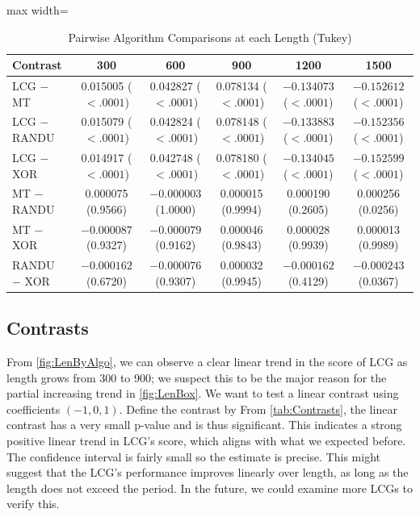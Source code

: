 \documentclass{report}
\begin{document}
\begin{table}[!htbp]
\centering
\begin{adjustbox}{max width=\textwidth}
\begin{tabular}{lccccc}
\toprule
\textbf{Contrast}
& \textbf{300}
& \textbf{600}
& \textbf{900}
& \textbf{1200}
& \textbf{1500} \\
\midrule

LCG $-$ MT
& 0.015005 ($<.0001$)
& 0.042827 ($<.0001$)
& 0.078134 ($<.0001$)
& $-0.134073$ ($<.0001$)
& $-0.152612$ ($<.0001$) \\

LCG $-$ RANDU
& 0.015079 ($<.0001$)
& 0.042824 ($<.0001$)
& 0.078148 ($<.0001$)
& $-0.133883$ ($<.0001$)
& $-0.152356$ ($<.0001$) \\

LCG $-$ XOR
& 0.014917 ($<.0001$)
& 0.042748 ($<.0001$)
& 0.078180 ($<.0001$)
& $-0.134045$ ($<.0001$)
& $-0.152599$ ($<.0001$) \\

\midrule

MT $-$ RANDU
& 0.000075 (0.9566)
& $-0.000003$ (1.0000)
& 0.000015 (0.9994)
& 0.000190 (0.2605)
& 0.000256 (0.0256) \\

MT $-$ XOR
& $-0.000087$ (0.9327)
& $-0.000079$ (0.9162)
& 0.000046 (0.9843)
& 0.000028 (0.9939)
& 0.000013 (0.9989) \\

RANDU $-$ XOR
& $-0.000162$ (0.6720)
& $-0.000076$ (0.9307)
& 0.000032 (0.9945)
& $-0.000162$ (0.4129)
& $-0.000243$ (0.0367) \\

\bottomrule

\end{tabular}
\end{adjustbox}
\caption{Pairwise Algorithm Comparisons at each Length (Tukey)}
\label{tab:AlgoCompByLen}
\end{table}


\subsection{Contrasts}
From \ref{fig:LenByAlgo}, we can observe a clear linear trend in the score of LCG as length grows from 300 to 900; we suspect this to be the major reason for the partial increasing trend in \ref{fig:LenBox}. We want to test a linear contrast using coefficients $(-1,0,1)$. Define the contrast by
From \ref{tab:Contrasts}, the linear contrast has a very small p-value and is thus significant. This indicates a strong positive linear trend in LCG's score, which aligns with what we expected before. The confidence interval is fairly small so the estimate is precise. This might suggest that the LCG's performance improves linearly over length, as long as the length does not exceed the period. In the future, we could examine more LCGs to verify this.
\end{document}
